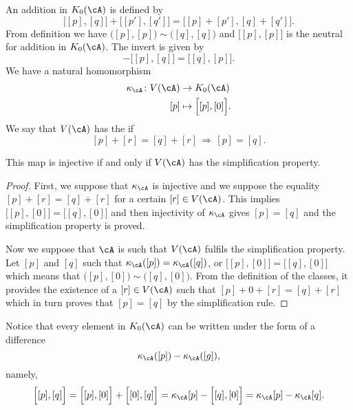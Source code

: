 An addition in $K_0(\cA)$ is defined by
\[
	\Big[ [p],[q] \Big]+\Big[ [p'],[q'] \Big]=\Big[ [p]+[p'],[q]+[q'] \Big].
\]
From definition we have $\Big( [p],[p] \Big)\sim\Big( [q],[q] \Big)$ and $\Big[ [p],[p] \Big]$ is the neutral for addition in $K_0(\cA)$. The invert is given by
\[
	-\Big[ [p],[q] \Big]=\Big[ [q],[p] \Big].
\]
We have a natural homomorphism
\begin{equation}
	\begin{aligned}
		\kappa_{\cA}\colon V(\cA) & \to K_0(\cA)                  \\
		[p]                       & \mapsto  \Big[ [p],[0] \Big].
	\end{aligned}
\end{equation}
We say that $V(\cA)$ has the  if
\[
	[p]+[r]=[q]+[r]\,\Rightarrow\,[p]=[q].
\]

\begin{proposition}
	This map is injective if and only if $V(\cA)$ has the simplification property.
\end{proposition}

\begin{proof}
	First, we suppose that $\kappa_{\cA}$ is injective and we suppose the equality $[p]+[r]=[q]+[r]$ for a certain $[r]\in V(\cA)$. This implies $\Big[ [p],[0] \Big]=\Big[ [q],[0] \Big]$ and then injectivity of $\kappa_{\cA}$ gives $[p]=[q]$ and the simplification property is proved.

	Now we suppose that $\cA$ is such that $V(\cA)$ fulfils the simplification property. Let $[p]$ and $[q]$ such that $\kappa_{\cA}([p])=\kappa_{\cA}([q])$, or $\Big[ [p],[0] \Big]=\Big[ [q],[0] \Big]$ which means that $\Big( [p],[0] \Big)\sim\Big( [q],[0] \Big)$. From the definition of the classes, it provides the existence of a $[r]\in V(\cA)$ such that $[p]+0+[r]=[q]+[r]$ which in turn proves that $[p]=[q]$ by the simplification rule.
\end{proof}

Notice that every element in $K_0(\cA)$ can be written under the form of a difference
\[
	\kappa_{\cA}([p])-\kappa_{\cA}([g]),
\]
namely,
\[
	\begin{split}
		\Big[ [p],[q] \Big]=\Big[ [p],[0] \Big]+\Big[ [0],[q] \Big]=\kappa_{\cA}[p]-\Big[ [q],[0] \Big]
		=\kappa_{\cA}[p]-\kappa_{\cA}[q].
	\end{split}
\]

